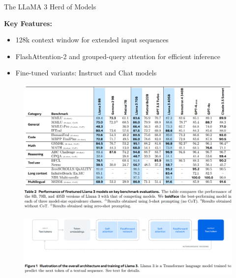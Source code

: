 \begin{frame}[allowframebreaks]{The LLaMA 3 Herd of Models}
\framebreak

    \textbf{Key Features:}
    \begin{itemize}
        \item 128k context window for extended input sequences
        \item FlashAttention-2 and grouped-query attention for efficient inference
        \item Fine-tuned variants: Instruct and Chat models
    \end{itemize}

\framebreak

    \begin{figure}
        \centering
        \includegraphics[height=0.88\textheight,width=1.08\textwidth,keepaspectratio]{images/recent-advance/llama-3-performance.png}
    \end{figure}
    
\framebreak

    \begin{figure}
        \centering
        \includegraphics[height=0.88\textheight,width=1.08\textwidth,keepaspectratio]{images/recent-advance/llama-3-architecture.png}
    \end{figure}
    
\framebreak


\end{frame}
